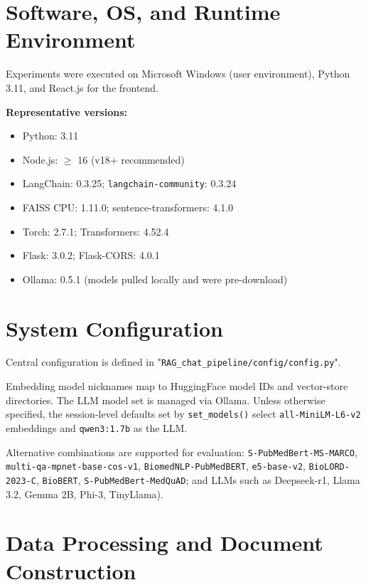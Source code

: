 \section{Software, OS, and Runtime Environment}
Experiments were executed on Microsoft Windows (user environment), Python 3.11, and React.js for the frontend.

\smallskip
\noindent\textbf{Representative versions:}
\begin{itemize}
  \item Python: 3.11
  \item Node.js: \(\ge\) 16 (v18+ recommended)
  \item LangChain: 0.3.25; \texttt{langchain-community}: 0.3.24
  \item FAISS CPU: 1.11.0; sentence-transformers: 4.1.0
  \item Torch: 2.7.1; Transformers: 4.52.4
  \item Flask: 3.0.2; Flask-CORS: 4.0.1
  \item Ollama: 0.5.1 (models pulled locally and were pre-download)
\end{itemize}

\section{System Configuration}
Central configuration is defined in "\texttt{RAG\_chat\_pipeline/config/config.py}".

\noindent Embedding model nicknames map to HuggingFace model IDs and vector-store directories. The LLM model set is managed via Ollama. Unless otherwise specified, the session-level defaults set by \texttt{set\_models()} select \texttt{all-MiniLM-L6-v2} embeddings and \texttt{qwen3:1.7b} as the LLM. 

Alternative combinations are supported for evaluation: \texttt{S-PubMedBert-MS-MARCO}, \texttt{multi-qa-mpnet-base-cos-v1}, \texttt{BiomedNLP-PubMedBERT}, \texttt{e5-base-v2}, \texttt{BioLORD-2023-C}, \texttt{BioBERT}, \texttt{S-PubMedBert-MedQuAD}; and LLMs such as Deepseek-r1, Llama 3.2, Gemma 2B, Phi-3, TinyLlama).

\section{Data Processing and Document Construction}

